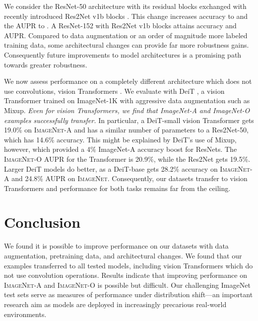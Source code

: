 \documentclass[10pt,twocolumn,letterpaper]{article}
\begin{document}
We consider the ResNet-50 architecture with its residual blocks exchanged with recently introduced Res2Net v1b blocks \cite{Gao2019Res2NetAN}. This change increases accuracy to  and the AUPR to . A ResNet-152 with Res2Net v1b blocks attains  accuracy and  AUPR. Compared to data augmentation or an order of magnitude more labeled training data, some architectural changes can provide far more robustness gains. Consequently future improvements to model architectures is a promising path towards greater robustness.

We now assess performance on a completely different architecture which does not use convolutions, vision Transformers \cite{Dosovitskiy2020AnII}.
We evaluate with DeiT \cite{touvron2020deit}, a vision Transformer trained on ImageNet-1K with aggressive data augmentation such as Mixup. \emph{Even for vision Transformers, we find that ImageNet-A and ImageNet-O examples successfully transfer.} In particular, a DeiT-small vision Transformer gets 19.0\% on \textsc{ImageNet-A} and has a similar number of parameters to a Res2Net-50, which has 14.6\% accuracy. This might be explained by DeiT's use of Mixup, however, which provided a 4\% ImageNet-A accuracy boost for ResNets. The \textsc{ImageNet-O} AUPR for the Transformer is 20.9\%, while the Res2Net gets 19.5\%. Larger DeiT models do better, as a DeiT-base gets 28.2\% accuracy on \textsc{ImageNet-A} and 24.8\% AUPR on \textsc{ImageNet}. Consequently, our datasets transfer to vision Transformers and performance for both tasks remains far from the ceiling. 
\section{Conclusion}


We found it is possible to improve performance on our datasets with data augmentation, pretraining data, and architectural changes. We found that our examples transferred to all tested models, including vision Transformers which do not use convolution operations. Results indicate that improving performance on \textsc{ImageNet-A} and \textsc{ImageNet-O} is possible but difficult. Our challenging ImageNet test sets serve as measures of performance under distribution shift---an important research aim as models are deployed in increasingly precarious real-world environments.





%
 
\newpage
{\small


}
\newpage
\end{document}
